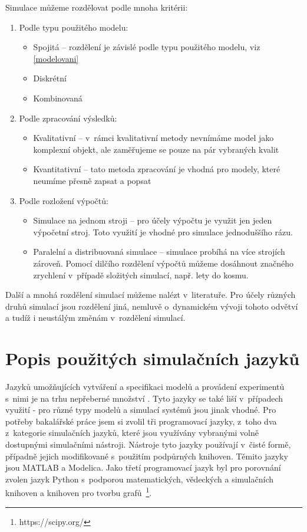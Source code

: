 Simulace můžeme rozdělovat podle mnoha kritérii:
\begin{enumerate}
    \item Podle typu použitého modelu:
        \begin{itemize}
            \item Spojitá -- rozdělení je závislé podle typu použitého modelu, viz \ref{modelovani}
            \item Diskrétní
            \item Kombinovaná
        \end{itemize}
    \item Podle zpracování výsledků:
        \begin{itemize}
            \item Kvalitativní -- v~rámci kvalitativní metody nevnímáme model jako komplexní objekt, ale zaměřujeme se pouze na pár vybraných kvalit
            \item Kvantitativní -- tato metoda zpracování je vhodná pro modely, které neumíme přesně zapsat a popsat
        \end{itemize}
    \item Podle rozložení výpočtů:
        \begin{itemize}
            \item Simulace na jednom stroji -- pro účely výpočtu je využit jen jeden výpočetní stroj. Toto využití je vhodné pro simulace jednoduššího rázu.
            \item Paralelní a distribuovaná simulace -- simulace probíhá na více strojích zároveň. Pomocí dilčího rozdělení výpočtů můžeme dosáhnout značného zrychlení v~případě složitých simulací, např. lety do kosmu.
        \end{itemize}
\end{enumerate}
Další a mnohá rozdělení simulací můžeme nalézt v~literatuře. Pro účely různých druhů simulací jsou rozdělení jiná, nemluvě o~dynamickém vývoji tohoto odvětví a tudíž i neustálým změnám v~rozdělení simulací.

\section{Popis použitých simulačních jazyků}

Jazyků umožňujících vytváření a specifikaci modelů a provádení experimentů s~nimi je na trhu nepřeberné množství \cite{list-of-process-modelling-lang}. Tyto jazyky se také liší v~případech využití - pro různé typy modelů a simulací systémů jsou jinak vhodné. Pro potřeby bakalářské práce jsem si zvolil tři programovací jazyky, z~toho dva z~kategorie simulačních jazyků, které jsou využívány vybranými volně dostupnými simulačními nástroji. Nástroje tyto jazyky používají v~čisté formě, případně jejich modifikované s~použitím podpůrných knihoven. Těmito jazyky jsou MATLAB a Modelica. Jako třetí programovací jazyk byl pro porovnání zvolen jazyk Python s~podporou matematických, vědeckých a simulačních knihoven a knihoven pro tvorbu grafů~\footnote{https://scipy.org/}.

